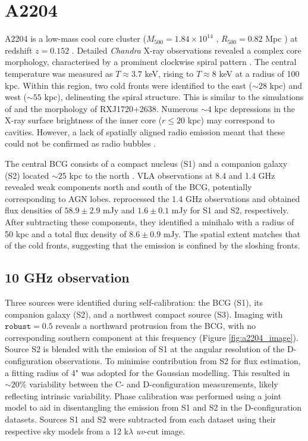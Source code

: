 \FloatBarrier

\section{A2204}
A2204 is a low-mass cool core cluster ($M_{500}=1.84\times10^{14}$ \Msun{}, $R_{500}=0.82$ Mpc \citep{Planck2016}) at redshift $z=0.152$ \citep{Sanders2011}. Detailed \textit{Chandra} X-ray observations revealed a complex core morphology, characterised by a prominent clockwise spiral pattern \citep{Sanders2005}. The central temperature was measured as $T\approx3.7$ keV, rising to $T\approx8$ keV at a radius of 100 kpc. Within this region, two cold fronts were identified to the east ($\sim\!28$ kpc) and west ($\sim\!55$ kpc), delineating the spiral structure. This is similar to the simulations of \citet{ZuHone2013} and the morphology of RXJ1720+2638. Numerous $\sim\!4$ kpc depressions in the X-ray surface brightness of the inner core ($r\leq20$ kpc) may correspond to cavities. However, a lack of spatially aligned radio emission meant that these could not be confirmed as radio bubbles \citep{Sanders2009}. 

The central BCG consists of a compact nucleus (S1) and a companion galaxy (S2) located $\sim\!25$ kpc to the north \citep{Sanders2005, Sanders2009}. VLA observations at 8.4 and 1.4 GHz revealed weak components north and south of the BCG, potentially corresponding to AGN lobes. \citet{Giacintucci2014} reprocessed the 1.4 GHz observations and obtained flux densities of $58.9\pm2.9$ mJy and $1.6\pm0.1$ mJy for S1 and S2, respectively. After subtracting these components, they identified a minihalo with a radius of 50 kpc and a total flux density of $8.6\pm0.9$ mJy. The spatial extent matches that of the cold fronts, suggesting that the emission is confined by the sloshing fronts.

\subsection{10 GHz observation}
Three sources were identified during self-calibration: the BCG (S1), its companion galaxy (S2), and a northwest compact source (S3). Imaging with $\texttt{robust}=0.5$ reveals a northward protrusion from the BCG, with no corresponding southern component at this frequency (Figure \ref{fig:a2204_image}). Source S2 is blended with the emission of S1 at the angular resolution of the D-configuration observations. To minimise contribution from S2 for flux estimation, a fitting radius of 4" was adopted for the Gaussian modelling. This resulted in $\sim\!20\%$ variability between the C- and D-configuration measurements, likely reflecting intrinsic variability. Phase calibration was performed using a joint model to aid in disentangling the emission from S1 and S2 in the D-configuration datasets. Sources S1 and S2 were subtracted from each dataset using their respective sky models from a 12 k$\lambda$ \textit{uv}-cut image. 

